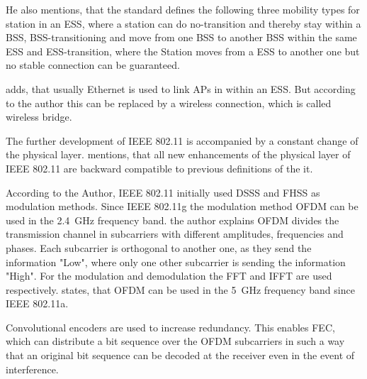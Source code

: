\documentclass[]{nsm-thesis}
\begin{document}
He also mentions, that the standard defines the following three mobility types for station in an \ac{ESS}, where a station can do no-transition and thereby stay within a \ac{BSS}, \ac{BSS}-transitioning and move from one \ac{BSS} to another \ac{BSS} within the same \ac{ESS} and \ac{ESS}-transition, where the Station moves from a \ac{ESS} to another one but no stable connection can be guaranteed.

\textcite{sauter_wireless_2022} adds, that usually Ethernet is used to link \ac{AP}s in within an \ac{ESS}. But according to the author this can be replaced by a wireless connection, which is called wireless bridge.

The further development of IEEE 802.11 is accompanied by a constant change of the physical layer. \textcite{sauter_wireless_2022} mentions, that all new enhancements of the physical layer of IEEE 802.11 are backward compatible to previous definitions of the it.

According to the Author, IEEE 802.11 initially used DSSS and FHSS as modulation methods.
Since IEEE 802.11g the modulation method \ac{OFDM} can be used in the \SI{2.4}{\giga\hertz} frequency band. the author explains \ac{OFDM} divides the transmission channel in subcarriers with different amplitudes, frequencies and phases. Each subcarrier is orthogonal to another one, as they send the information "Low", where only one other subcarrier is sending the information "High".
For the modulation and demodulation the FFT and IFFT are used respectively.
\textcite{kauffels_wireless_2002} states, that \ac{OFDM} can be used in the \SI{5}{\giga\hertz} frequency band since IEEE 802.11a.

Convolutional encoders are used to increase redundancy. This enables \ac{FEC}, which can distribute a bit sequence over the \ac{OFDM} subcarriers in such a way that an original bit sequence can be decoded at the receiver even in the event of interference. \textcite{kauffels_wireless_2002}
\end{document}
